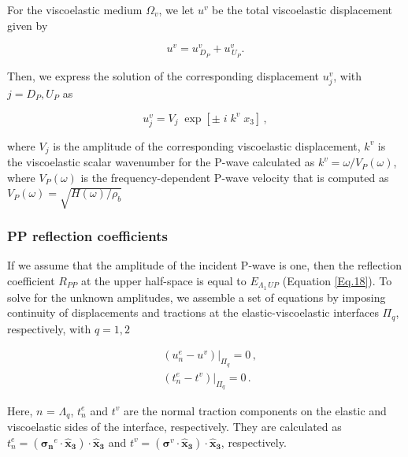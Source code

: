 \documentclass[draft]{agujournal2019}
\begin{document}
For the viscoelastic medium $\Omega_v$, we let  $u^v$ be the total viscoelastic displacement given by 
\begin{linenomath*}
\begin{equation}\label{Eq.19}
u^v=  u_{\,D_P}^v  + u_{\,U_P}^v.
\end{equation}
\end{linenomath*}

Then, we express the solution of the corresponding displacement $u_j^v$, with $j = D_P , U_P$ as
\begin{linenomath*}
\begin{equation}\label{Eq.20}
u_j^v = V_j \;\exp[ \pm\; i \; k^v \; x_3 ]\,,
\end{equation}
\end{linenomath*}
where $V_j$ is the amplitude of the corresponding viscoelastic displacement, $ k^v$ is the viscoelastic scalar wavenumber for the P-wave calculated as $ k^v=\omega / V_P(\omega)$, where $V_P(\omega)$ is the frequency-dependent P-wave velocity that is computed as $V_P(\omega) = \sqrt{H(\omega) /\rho_b }$

\subsubsection{PP reflection coefficients}
If we assume that the amplitude of the incident P-wave is one, then the reflection coefficient $R_{PP}$ at the upper half-space is equal to $E_{\Lambda_1\, UP}$ (Equation \eqref{Eq.18}). To solve for the unknown amplitudes,  we assemble a set of equations by imposing continuity of displacements and tractions at the elastic-viscoelastic interfaces $\Pi_q$, respectively, with $q=1,2$
\begin{linenomath*}
\begin{equation}\label{Eq.21}
\begin{split}
&  \left. \left(  u_n^e -  u^v \right) \right \rvert_{\Pi_q} = 0 \,, \\
&  \left. \left( t_n^e  - t^v  \right) \right \rvert_{\Pi_q} = 0 \,.
\end{split}
\end{equation}
\end{linenomath*}
Here, $n$ = $\Lambda_q$, $t_n^e$ and $t^v$ are the normal traction components on the elastic and viscoelastic sides of the interface, respectively. They are calculated as $t_n^e =( \bm{\sigma_n}^e \cdot \bm{\hat {x}_3})\cdot \bm{\hat {x}_3} $ and  
$t^v =( \bm{\sigma}^v \cdot \bm{\hat {x}_3})\cdot \bm{\hat {x}_3} $, respectively.
\end{document}
